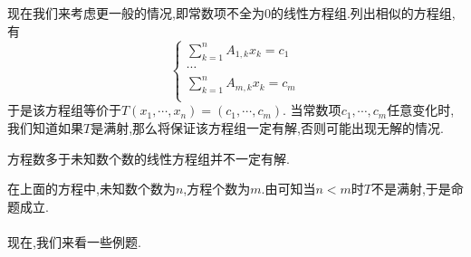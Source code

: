 \documentclass{ctexart}
\begin{document}
现在我们来考虑更一般的情况,即常数项不全为$0$的线性方程组.列出相似的方程组,有
$$\left\{\begin{array}{l}
    \displaystyle\sum_{k=1}^{n}A_{1,k}x_k=c_1\\
    \cdots\\
    \displaystyle\sum_{k=1}^{n}A_{m,k}x_k=c_m\\
\end{array}\right.$$
于是该方程组等价于$T(x_1,\cdots,x_n)=(c_1,\cdots,c_m)$.
当常数项$c_1,\cdots,c_m$任意变化时,我们知道如果$T$是满射,那么将保证该方程组一定有解,否则可能出现无解的情况.\\
\begin{formal}[3.4 齐次线性方程组具有非零解的条件]
    方程数多于未知数个数的线性方程组并不一定有解.
\end{formal}\noindent
在上面的方程中,未知数个数为$n$,方程个数为$m$.由可知当$n<m$时$T$不是满射,于是命题成立.\\
\ \\
现在,我们来看一些例题.
\begin{problem}[Example 1.]
    
\end{problem}
\end{document}
